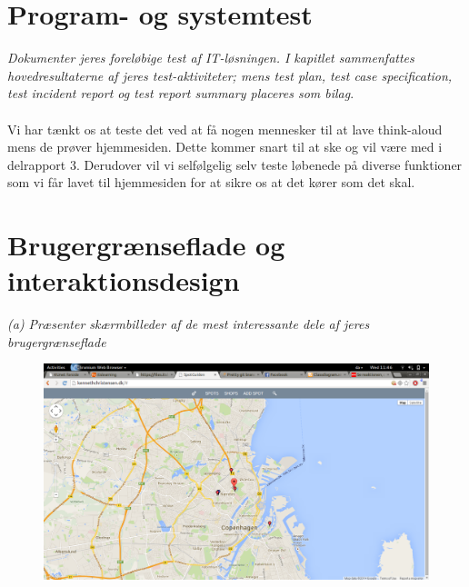 \documentclass[12pt]{article}
\begin{document}
\section{Program- og systemtest}
\textit{Dokumenter jeres foreløbige test af IT-løsningen. I kapitlet sammenfattes hovedresultaterne af
jeres test-aktiviteter; mens test plan, test case specification, test incident report og test report
summary placeres som bilag}.\\\\
Vi har tænkt os at teste det ved at få nogen mennesker til at lave think-aloud mens de prøver hjemmesiden. Dette kommer snart til at ske og vil være med i delrapport 3. Derudover vil vi selfølgelig selv teste løbenede på diverse funktioner som vi får lavet til hjemmesiden for at sikre os at det kører som det skal.
\pagebreak
\section{Brugergrænseflade og interaktionsdesign}
\textit{(a) Præsenter skærmbilleder af de mest interessante dele af jeres brugergrænseflade}

\begin{figure}[h]
\includegraphics[scale = 0.3]{screen1}
\end{figure}
\end{document}
